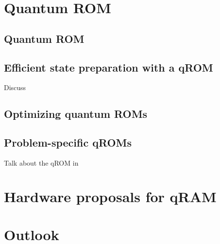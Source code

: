 \documentclass[a4paper,12pt]{article}
\begin{document}
\section{Quantum ROM}
\label{sec:circuits}

\subsection{Quantum ROM}

\subsection{Efficient state preparation with a qROM}

Discuss \cite{Vadym2018}

\subsection{Optimizing quantum ROMs}

\subsection{Problem-specific qROMs}

Talk about the qROM in \cite{Babbush2018}

\section{Hardware proposals for qRAM}
\label{sec:hardware}




\section{Outlook}
\label{sec:outlook}




\end{document}
